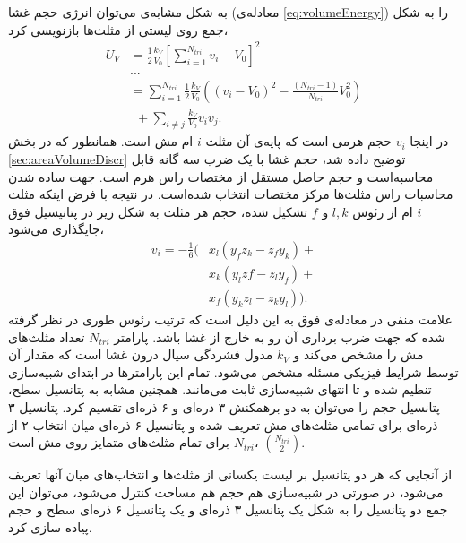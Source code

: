 به شکل مشابه‌ی می‌توان انرژی حجم غشا (معادله‌ی 
\ref{eq:volumeEnergy})
 را به شکل جمع روی لیستی از مثلث‌ها بازنویسی کرد،
\begin{equation}
\begin{aligned}
U_{V}&=\frac{1}{2}\frac{k_V}{V_0}\left[\sum_{i=1}^{N_{tri}}v_i-V_0\right]^2\\
&...\\
&=\sum_{i=1}^{N_{tri}}\frac{1}{2}\frac{k_V}{V_0}\left((v_i-V_0)^2-\frac{(N_{tri}-1)}{N_{tri}}V_0^2\right)\\
&~~+\sum_{i\neq j}\frac{k_V}{V_0}v_iv_j.
\label{eq:VolumePotentialExpansion}
\end{aligned}
\end{equation}
 در اینجا
$v_i$
حجم هرمی است که پایه‌ی آن مثلث‌
$i$
ام مش است. همانطور که در بخش
\ref{sec:areaVolumeDiscr}
توضیح داده شد، حجم غشا با یک ضرب سه گانه قابل محاسبه‌است و حجم حاصل مستقل از مختصات راس هرم است. جهت ساده شدن محاسبات راس مثلث‌ها  مرکز مختصات انتخاب شده‌است. در نتیجه با فرض اینکه مثلث 
$i$
ام از رئوس
$l,k$
و
$f$
تشکیل شده، حجم هر مثلث به شکل زیر در پتانیسیل فوق جایگذاری می‌شود،
\begin{equation}
\begin{aligned}
v_i=-\frac{1}{6}(&x_l(y_fz_k-z_fy_k)+\\
&x_k(y_lzf-z_ly_f)+\\
&x_f(y_kz_l-z_ky_l)).
\end{aligned}
\label{eq:VolumeTripleProductDef}
\end{equation}
 علامت منفی در معادله‌ی فوق به این دلیل است که ترتیب رئوس طوری در نظر گرفته شده که جهت ضرب برداری آن رو به خارج از غشا باشد. پارامتر 
 $N_{tri}$
تعداد مثلث‌های مش را مشخص می‌کند و 
$k_V$
مدول فشردگی سیال درون غشا است که مقدار آن توسط شرایط فیزیکی مسئله مشخص می‌شود. تمام این پارامتر‌ها در ابتدای شبیه‌سازی تنظیم شده و تا انتهای شبیه‌سازی ثابت می‌مانند. همچنین مشابه به پتانسیل سطح، پتانسیل حجم را می‌توان به دو برهمکنش ۳ ذره‌ای و ۶ ذره‌ای تقسیم کرد. پتانسیل ۳ ذره‌ای برای تمامی مثلث‌های مش تعریف شده و پتانسیل ۶ ذره‌ای میان انتخاب ۲ از 
$N_{tri}$
برای تمام مثلث‌های متمایز روی مش است،
 ${N_{tri} \choose 2}$.

از آنجایی که هر دو پتانسیل بر لیست یکسانی از مثلث‌ها و انتخاب‌های میان آنها تعریف می‌شود، در صورتی در شبیه‌سازی هم حجم هم مساحت کنترل می‌شود، می‌توان این جمع دو پتانسیل را به شکل یک پتانسیل ۳ ذره‌ای و یک پتانسیل ۶ ذره‌ای سطح و حجم پیاده سازی کرد.










